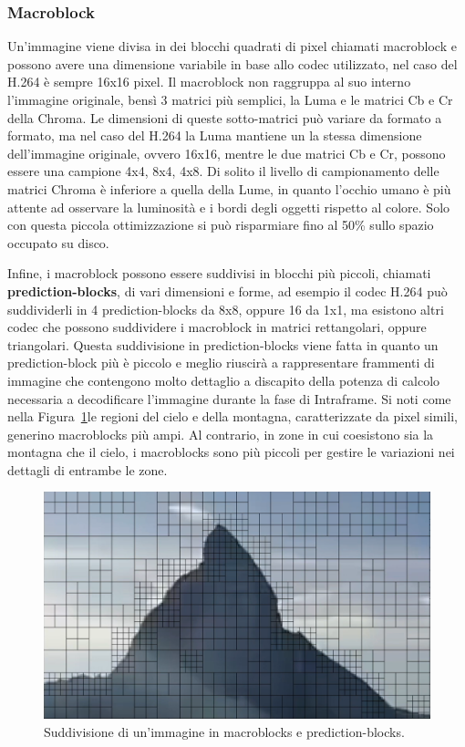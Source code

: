 \documentclass[a4paper,12pt, oneside]{article}
\begin{document}
\subsubsection{Macroblock}
Un'immagine viene divisa in dei blocchi quadrati di pixel chiamati macroblock e possono avere una
dimensione variabile in base allo codec utilizzato, nel caso del H.264 è sempre 16x16 pixel. Il
macroblock non raggruppa al suo interno l'immagine originale, bensì 3 matrici più semplici, la
Luma e le matrici Cb e Cr della Chroma. Le dimensioni di queste sotto-matrici può variare da
formato a formato, ma nel caso del H.264 la Luma mantiene un la stessa dimensione dell'immagine
originale, ovvero 16x16, mentre le due matrici Cb e Cr, possono essere una campione 4x4, 8x4, 4x8.
Di solito il livello di campionamento delle matrici Chroma è inferiore a quella della Lume, in quanto
l'occhio umano è più attente ad osservare la luminosità e i bordi degli oggetti rispetto al colore.
Solo con questa piccola ottimizzazione si può risparmiare fino al 50\% sullo spazio occupato su disco.

Infine, i macroblock possono essere suddivisi in blocchi più piccoli, chiamati
\textbf{prediction-blocks}, di vari dimensioni e forme, ad esempio il codec H.264 può suddividerli in
4 prediction-blocks da 8x8, oppure 16 da 1x1, ma esistono altri codec che possono suddividere i
macroblock in matrici rettangolari, oppure triangolari. Questa suddivisione in prediction-blocks
viene fatta in quanto un prediction-block più è piccolo e meglio riuscirà a rappresentare frammenti
di immagine che contengono molto dettaglio a discapito della potenza di calcolo necessaria a
decodificare l'immagine durante la fase di Intraframe. Si noti come nella
Figura~\ref{fig:macroblocks_sub_division}le regioni del cielo e della montagna, caratterizzate da
pixel simili, generino macroblocks più ampi. Al contrario, in zone in cui coesistono sia la montagna
che il cielo, i macroblocks sono più piccoli per gestire le variazioni nei dettagli di entrambe le
zone.

\begin{figure}[h]
    \centering
    \includegraphics[width=1\textwidth]{images/macroblocks_sub-division.png}
    \caption{Suddivisione di un'immagine in macroblocks e prediction-blocks.}
    \label{fig:macroblocks_sub_division}
\end{figure}
\end{document}
